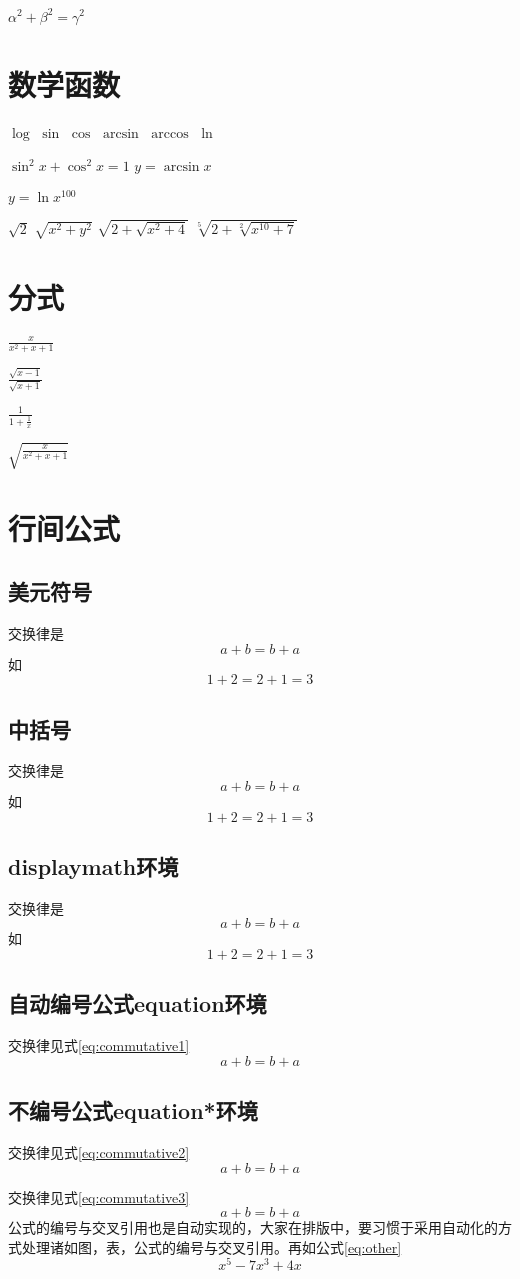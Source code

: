 \documentclass{article}
\begin{document}
	$\alpha^2 + \beta^2 = \gamma^2$
	\section{数学函数}
	$\log$
	$\sin$
	$\cos$
	$\arcsin$
	$\arccos$
	$\ln$
	
	$\sin^2 x + \cos^2 x = 1$
	$y = \arcsin x$
	
	$y = \ln x^{100}$
	
	$\sqrt{2}$
	$\sqrt{x^2 + y^2}$
	$\sqrt{2 + \sqrt{x^2 + 4}}$
	$\sqrt[5]{2 + \sqrt[2]{x^{10}+7}}$
	\section{分式}
	$\frac{x}{x^2+x+1}$
	
	$\frac{\sqrt{x-1}}{\sqrt{x+1}}$
	
	$\frac{1}{1+ \frac{1}{x}}$
	
	$\sqrt{\frac{x}{x^2+x+1}}$
	\section{行间公式}
	
	\subsection{美元符号}
	交换律是
	$$a +b=b+a$$
	如
	$$1+2=2+1=3$$
	\subsection{中括号}
	交换律是
	\[a+b=b+a\]
	如
	\[1+2=2+1=3\]
	\subsection{displaymath环境}
	交换律是
	\begin{displaymath}	a+b=b+a \end{displaymath}
	如
	\begin{displaymath}1+2=2+1=3\end{displaymath}
	\subsection{自动编号公式equation环境}
	交换律见式\ref{eq:commutative1}
	\begin{equation}
		a+b=b+a   \label{eq:commutative1}
	\end{equation}
	\subsection{不编号公式equation*环境}
	交换律见式\ref{eq:commutative2}
	\begin{equation*}
		a+b=b+a \label{eq:commutative2}
	\end{equation*}

	交换律见式\ref{eq:commutative3}
	\begin{equation}
		a+b=b+a \label{eq:commutative3}
	\end{equation}
	公式的编号与交叉引用也是自动实现的，大家在排版中，要习惯于采用自动化的方式处理诸如图，表，公式的编号与交叉引用。再如公式\ref{eq:other}
	\begin{equation}
		x^5-7x^3+4x \label{eq:other}
	\end{equation}
\end{document}
